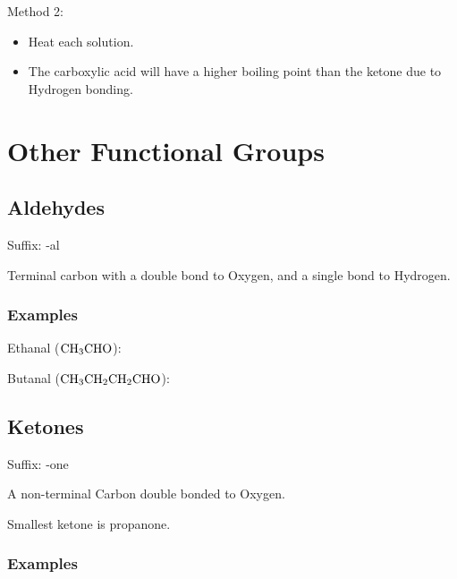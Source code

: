 \documentclass[a4paper,11pt]{article}
\begin{document}
Method 2:

\begin{itemize}
\item Heat each solution.
\item The carboxylic acid will have a higher boiling point than the ketone due
	to Hydrogen bonding.
\end{itemize}




\section{Other Functional Groups}

\subsection{Aldehydes}

Suffix: -al

Terminal carbon with a double bond to Oxygen, and a single bond to Hydrogen.


\subsubsection{Examples}

Ethanal ($\ce{CH3CHO}$):

\begin{center}
\end{center}

Butanal ($\ce{CH3CH2CH2CHO}$):

\begin{center}
\end{center}


\subsection{Ketones}

Suffix: -one

A non-terminal Carbon double bonded to Oxygen.

Smallest ketone is propanone.


\subsubsection{Examples}
\end{document}
